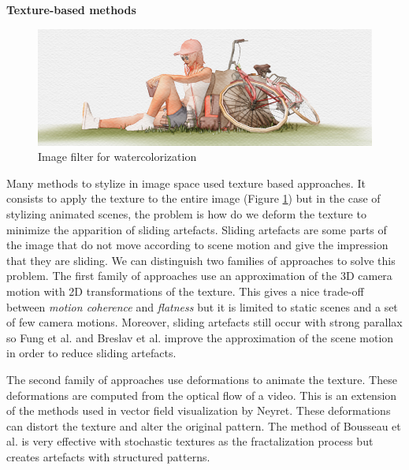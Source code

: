 \textbf{Texture-based methods}

\begin{figure}
    \begin{center}

    \includegraphics[scale=0.5]{pics/watercolor_MNPR.png}
    \end{center}
    \caption{Image filter for watercolorization \cite{montesdeoca_mnpr:_2018}}
    \label{watercolor_MNPR}
\end{figure}

Many methods to stylize in image space used texture based approaches. It consists to apply the texture to the entire image (Figure \ref{watercolor_MNPR}) \cite{benard_state---art_2011, montesdeoca_mnpr:_2018} but in the case of stylizing animated scenes, the problem is how do we deform the texture to minimize the apparition of sliding artefacts. Sliding artefacts are some parts of the image that do not move according to scene motion and give the impression that they are sliding. We can distinguish two families of approaches to solve this problem. The first family of approaches use an approximation of the 3D camera motion with 2D transformations of the texture\cite{cunzi_dynamic_nodate}. This gives a nice trade-off between \textit{motion coherence} and \textit{flatness} but it is limited to static scenes and a set of few camera motions. Moreover, sliding artefacts still occur with strong parallax so Fung et al.\cite{fung_pen-and-ink_nodate} and Breslav et al.\cite{breslav_dynamic_nodate} improve the approximation of the scene motion in order to reduce sliding artefacts.

The second family of approaches use deformations to animate the texture\cite{bousseau_video_2007}. These deformations are computed from the optical flow of a video. This is an extension of the methods used in vector field visualization by Neyret\cite{neyret_imagis-gravir_nodate}. These deformations can distort the texture and alter the original pattern. The method of Bousseau et al.\cite{bousseau_video_2007} is very effective with stochastic textures as the fractalization process but creates artefacts with structured patterns. \newline

